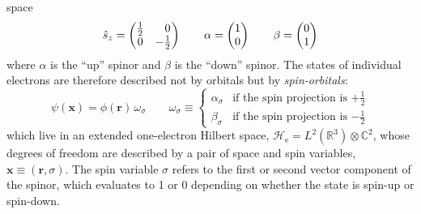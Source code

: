 space
\begin{equation}
    \hat{s}_z
    =
    \begin{pmatrix}
        \tfrac{1}{2} & \hphantom{+}0 \\
        0 & -\tfrac{1}{2}
    \end{pmatrix}
    \qquad
    \alpha
    =
    \begin{pmatrix}
        1 \\ 0
    \end{pmatrix}
    \qquad
    \beta
    =
    \begin{pmatrix}
        0 \\ 1
    \end{pmatrix}
\end{equation}
where \(\alpha\) is the ``up'' spinor and \(\beta\) is the ``down'' spinor.
The states of individual electrons are therefore described not by orbitals but
by {\itshape spin-orbitals}:
\begin{equation}
    \psi(\mathbf{x})
    =
    \phi(\mathbf{r})\,
    \omega_\sigma
    \qquad
    \omega_\sigma
    \equiv
    \left\{
        \begin{array}{cl}
            \alpha_{\sigma}
            &
            \text{if the spin projection is \(+\tfrac{1}{2}\)}
            \\[10pt]
            \beta_{\sigma}
            &
            \text{if the spin projection is \(-\tfrac{1}{2}\)}
        \end{array}
    \right.
\end{equation}
which live in an extended one-electron Hilbert space,
\(
    \mathcal{H}_\mathrm{e}
    =
    L^2(\mathbb{R}^3)
    \otimes
    \mathbb{C}^2
\),
whose degrees of freedom are described by a pair of space and spin variables,
\(
    \mathbf{x}
    \equiv
    (\mathbf{r},\sigma)
\).
The spin variable \(\sigma\) refers to the first or second vector component of
the spinor, which evaluates to 1 or 0 depending on whether the state is spin-up
or spin-down.

